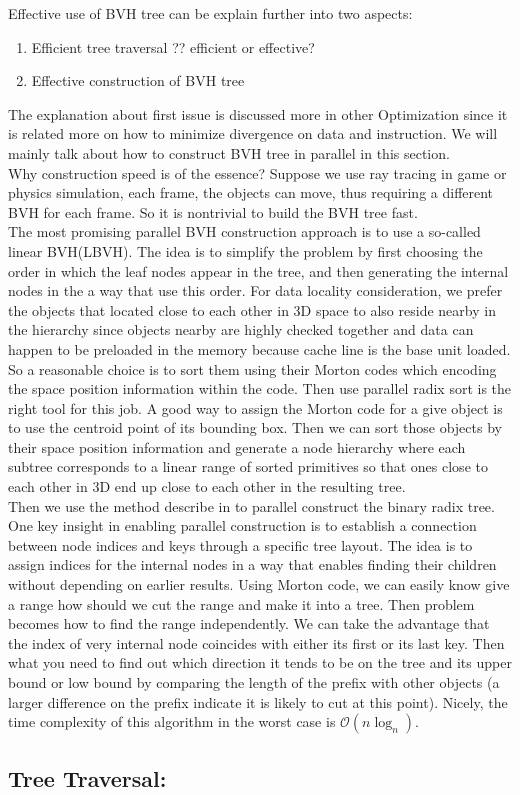 \documentclass[a4paper,10pt]{article}
\begin{document}
Effective use of BVH tree can be explain further into two aspects:
\begin{enumerate}
    \item Efficient tree traversal ?? efficient or effective? 
    \item Effective construction of BVH tree
\end{enumerate}
The explanation about first issue is discussed more in other Optimization since it is related more on how to minimize divergence on data and instruction. We will mainly talk about how to construct BVH tree in parallel in this section. \\
Why construction speed is of the essence? Suppose we use ray tracing in game or physics simulation, each frame, the objects can move, thus requiring a different BVH for each frame. So it is nontrivial to build the BVH tree fast. \\
The most promising parallel BVH construction approach is to use a so-called linear BVH(LBVH). The idea is to simplify the problem by first choosing the order in which the leaf nodes appear in the tree, and then generating the internal nodes in the a way that use this order. For data locality consideration, we prefer the objects that located close to each other in 3D space to also reside nearby in the hierarchy since objects nearby are highly checked together and data can happen to be preloaded in the memory because cache line is the base unit loaded. So a reasonable choice is to sort them using their Morton codes which encoding the space position information within the code. Then use parallel radix sort is the right tool for this job. A good way to assign the Morton code for a give object is to use the centroid point of its bounding box. Then we can sort those objects by their space position information and generate a node hierarchy where each subtree corresponds to a linear range of sorted primitives so that ones close to each other in 3D end up close to each other in the resulting tree. \\
Then we use the method describe in \cite{karras2012maximizing} to parallel construct the binary radix tree. One key insight in enabling parallel construction is to establish a connection between node indices and keys through a specific tree layout. The idea is to assign indices for the internal nodes in a way that enables finding their children without depending on earlier results. Using Morton code, we can easily know give a range how should we cut the range and make it into a tree. Then problem becomes how to find the range independently. We can take the advantage that the index of very internal node coincides with either its first or its last key. Then what you need to find out which direction it tends to be on the tree and its upper bound or low bound by comparing the length of the prefix with other objects (a larger difference on the prefix indicate it is likely to cut at this point). Nicely, the time complexity of this algorithm in the worst case is $\mathcal{O}(n\log_n)$.

\subsection{Tree Traversal:}



\medskip


\end{document}
